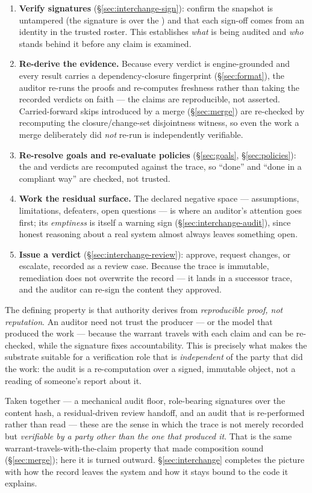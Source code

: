 \begin{enumerate}
\item \textbf{Verify signatures} (\S\ref{sec:interchange-sign}): confirm the snapshot is untampered (the
  signature is over the ) and that each sign-off comes from an identity in the trusted
  roster. This establishes \emph{what} is being audited and \emph{who} stands behind it before any claim is
  examined.
\item \textbf{Re-derive the evidence.} Because every verdict is engine-grounded and every result carries a
  dependency-closure fingerprint (\S\ref{sec:format}), the auditor re-runs the proofs and re-computes
  freshness rather than taking the recorded verdicts on faith --- the claims are reproducible, not asserted.
  Carried-forward skips introduced by a merge (\S\ref{sec:merge}) are re-checked by recomputing the
  closure/change-set disjointness witness, so even the work a merge deliberately did \emph{not} re-run is
  independently verifiable.
\item \textbf{Re-resolve goals and re-evaluate policies} (\S\ref{sec:goals}, \S\ref{sec:policies}): the
   and  verdicts are recomputed against the trace, so ``done'' and ``done in a
  compliant way'' are checked, not trusted.
\item \textbf{Work the residual surface.} The declared negative space --- assumptions, limitations,
  defeaters, open questions --- is where an auditor's attention goes first; its \emph{emptiness} is itself a
  warning sign (\S\ref{sec:interchange-audit}), since honest reasoning about a real system almost always
  leaves something open.
\item \textbf{Issue a verdict} (\S\ref{sec:interchange-review}): approve, request changes, or escalate,
  recorded as a review case. Because the trace is immutable, remediation does not overwrite the record ---
  it lands in a successor trace, and the auditor can re-sign the content they approved.
\end{enumerate}

The defining property is that authority derives from \emph{reproducible proof, not reputation}. An auditor
need not trust the producer --- or the model that produced the work --- because the warrant travels with each
claim and can be re-checked, while the signature fixes accountability. This is precisely what makes the
substrate suitable for a verification role that is \emph{independent} of the party that did the work: the
audit is a re-computation over a signed, immutable object, not a reading of someone's report about it.


\medskip\noindent
Taken together --- a mechanical audit floor, role-bearing signatures over the content hash, a
residual-driven review handoff, and an audit that is re-performed rather than read --- these are the sense in
which the trace is not merely recorded but \emph{verifiable by a party other than the one that produced it}.
That is the same warrant-travels-with-the-claim property that made composition sound (\S\ref{sec:merge});
here it is turned outward. \S\ref{sec:interchange} completes the picture with how the record leaves the
system and how it stays bound to the code it explains.
